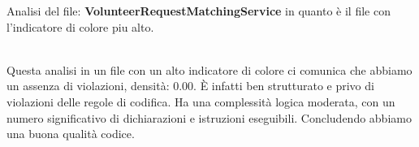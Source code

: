 Analisi del file: \textbf{VolunteerRequestMatchingService} in quanto è il file con l'indicatore di colore piu alto.

\\[2ex]

Questa analisi in un file con un alto indicatore di colore ci comunica che abbiamo un assenza di violazioni, densità: 0.00.
È infatti ben strutturato e privo di violazioni delle regole di codifica.
Ha una complessità logica moderata, con un numero significativo di dichiarazioni e istruzioni eseguibili.
Concludendo abbiamo una buona qualità codice.
